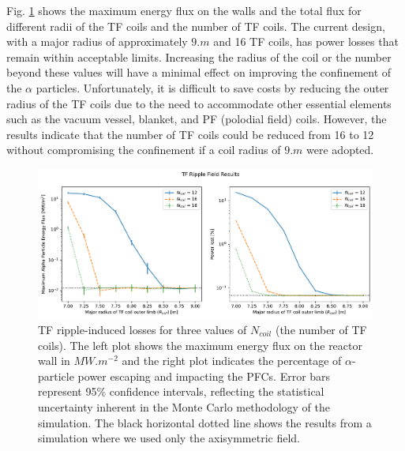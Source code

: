 \documentclass[10pt, a4paper, twoside]{article}
\begin{document}
Fig. \ref{fig:max_and_total_flux_vs_rcoil_and_ncoil} shows the maximum energy flux on the walls and the total flux for different radii of the TF coils and the number of TF coils. The current design, with a major radius of approximately $\si{9.m}$ and 16 TF coils, has power losses that remain within acceptable limits. Increasing the radius of the coil or the number beyond these values will have a minimal effect on improving the confinement of the $\alpha$ particles. 
Unfortunately, it is difficult to save costs by reducing the outer radius of the TF coils due to the need to accommodate other essential elements such as the vacuum vessel, blanket, and PF (polodial field) coils. However, the results indicate that the number of TF coils could be reduced from 16 to 12 without compromising the confinement if a coil radius of $\si{9.m}$ were adopted.

\begin{figure}[htpb]
    \centering
    \vspace{1cm}
    \includegraphics[width=0.99\linewidth]{Figures/max_and_total_flux_vs_rcoil.pdf}
    \caption{TF ripple-induced losses for three values of $N_{coil}$ (the number of TF coils). The left plot shows the maximum energy flux on the reactor wall in $\si{MW.m^{-2}}$ and the right plot indicates the percentage of $\alpha$-particle power escaping and impacting the PFCs. Error bars represent 95\% confidence intervals, reflecting the statistical uncertainty inherent in the Monte Carlo methodology of the simulation. The black horizontal dotted line shows the results from a simulation where we used only the axisymmetric field.}
    \label{fig:max_and_total_flux_vs_rcoil_and_ncoil}
\end{figure}
\end{document}

